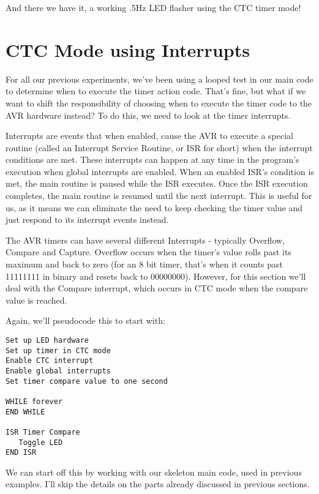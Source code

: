 \documentclass[a4paper,oneside,notitlepage]{book}
\begin{document}
And there we have it, a working .5Hz LED flasher using the CTC timer mode!


\label{chp:CTCInt}
\chapter{CTC Mode using Interrupts}

For all our previous experiments, we've been using a looped test in our main code to determine when to execute the timer action code. That's fine, but what if we want to shift the responsibility of choosing when to execute the timer code to the AVR hardware instead? To do this, we need to look at the timer interrupts.

Interrupts are events that when enabled, cause the AVR to execute a special routine (called an Interrupt Service Routine, or ISR for short) when the interrupt conditions are met. These interrupts can happen at any time in the program's execution when global interrupts are enabled. When an enabled ISR's condition is met, the main routine is paused while the ISR executes. Once the ISR execution completes, the main routine is resumed until the next interrupt. This is useful for us, as it means we can eliminate the need to keep checking the timer value and just respond to its interrupt events instead.

The AVR timers can have several different Interrupts - typically Overflow, Compare and Capture. Overflow occurs when the timer's value rolls past its maximum and back to zero (for an 8 bit timer, that's when it counts past 11111111 in binary and resets back to 00000000). However, for this section we'll deal with the Compare interrupt, which occurs in CTC mode when the compare value is reached.

Again, we'll pseudocode this to start with:

\begin{center}
\begin{lstlisting}[keywordstyle=\color{black},commentstyle=\color{black}]
Set up LED hardware
Set up timer in CTC mode
Enable CTC interrupt
Enable global interrupts
Set timer compare value to one second

WHILE forever
END WHILE

ISR Timer Compare
   Toggle LED
END ISR
\end{lstlisting}
\end{center}

We can start off this by working with our skeleton main code, used in previous examples. I'll skip the details on the parts already discussed in previous sections.
\end{document}
